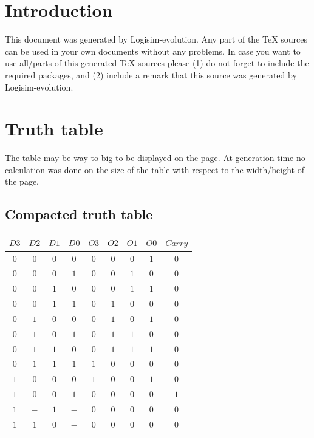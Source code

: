 \documentclass [15pt,a4paper,twoside]{article}
\begin{document}
\section{Introduction}
This document was generated by Logisim-evolution. Any part of the TeX sources can be used in your own documents without any problems. In case you want to use all/parts of this generated TeX-sources please (1) do not forget to include the required packages, and (2) include a remark that this source was generated by Logisim-evolution.
\section{Truth table}
The table may be way to big to be displayed on the page. At generation time no calculation was done on the size of the table with respect to the width/height of the page.
\subsection{Compacted truth table}
\begin{center}
\begin{tabular}{cccc|ccccc}
$D3$&$D2$&$D1$&$D0$&$O3$&$O2$&$O1$&$O0$&$Carry$\\
\hline
$0$&$0$&$0$&$0$&$0$&$0$&$0$&$1$&$0$\\
$0$&$0$&$0$&$1$&$0$&$0$&$1$&$0$&$0$\\
$0$&$0$&$1$&$0$&$0$&$0$&$1$&$1$&$0$\\
$0$&$0$&$1$&$1$&$0$&$1$&$0$&$0$&$0$\\
$0$&$1$&$0$&$0$&$0$&$1$&$0$&$1$&$0$\\
$0$&$1$&$0$&$1$&$0$&$1$&$1$&$0$&$0$\\
$0$&$1$&$1$&$0$&$0$&$1$&$1$&$1$&$0$\\
$0$&$1$&$1$&$1$&$1$&$0$&$0$&$0$&$0$\\
$1$&$0$&$0$&$0$&$1$&$0$&$0$&$1$&$0$\\
$1$&$0$&$0$&$1$&$0$&$0$&$0$&$0$&$1$\\
$1$&$-$&$1$&$-$&$0$&$0$&$0$&$0$&$0$\\
$1$&$1$&$0$&$-$&$0$&$0$&$0$&$0$&$0$\\

\end{tabular}
\end{center}
\end{document}
